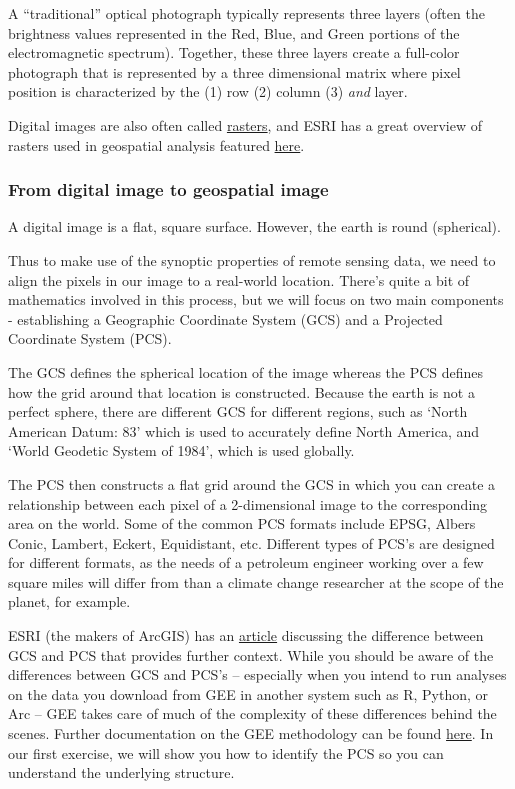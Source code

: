 \documentclass[
]{article}
\begin{document}
A ``traditional'' optical photograph typically represents three layers (often the brightness values represented in the Red, Blue, and Green portions of the electromagnetic spectrum). Together, these three layers create a full-color photograph that is represented by a three dimensional matrix where pixel position is characterized by the (1) row (2) column (3) \emph{and} layer.

Digital images are also often called \href{https://en.wikipedia.org/wiki/Raster_graphics}{rasters}, and ESRI has a great overview of rasters used in geospatial analysis featured \href{https://desktop.arcgis.com/en/arcmap/10.3/manage-data/raster-and-images/what-is-raster-data.htm}{here}.

\hypertarget{from-digital-image-to-geospatial-image}{%
\subsubsection{From digital image to geospatial image}\label{from-digital-image-to-geospatial-image}}

A digital image is a flat, square surface. However, the earth is round (spherical).

Thus to make use of the synoptic properties of remote sensing data, we need to align the pixels in our image to a real-world location. There's quite a bit of mathematics involved in this process, but we will focus on two main components - establishing a Geographic Coordinate System (GCS) and a Projected Coordinate System (PCS).

The GCS defines the spherical location of the image whereas the PCS defines how the grid around that location is constructed. Because the earth is not a perfect sphere, there are different GCS for different regions, such as `North American Datum: 83' which is used to accurately define North America, and `World Geodetic System of 1984', which is used globally.

The PCS then constructs a flat grid around the GCS in which you can create a relationship between each pixel of a 2-dimensional image to the corresponding area on the world. Some of the common PCS formats include EPSG, Albers Conic, Lambert, Eckert, Equidistant, etc. Different types of PCS's are designed for different formats, as the needs of a petroleum engineer working over a few square miles will differ from than a climate change researcher at the scope of the planet, for example.

ESRI (the makers of ArcGIS) has an \href{https://www.esri.com/arcgis-blog/products/arcgis-pro/mapping/gcs_vs_pcs/}{article} discussing the difference between GCS and PCS that provides further context. While you should be aware of the differences between GCS and PCS's -- especially when you intend to run analyses on the data you download from GEE in another system such as R, Python, or Arc -- GEE takes care of much of the complexity of these differences behind the scenes. Further documentation on the GEE methodology can be found \href{https://developers.google.com/earth-engine/guides/projections}{here}. In our first exercise, we will show you how to identify the PCS so you can understand the underlying structure.
\end{document}
